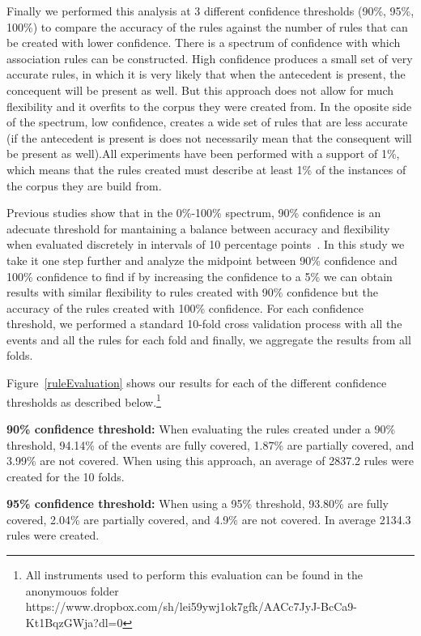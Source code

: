 \documentclass[sigconf]{acmart}
\begin{document}
Finally we performed this analysis at 3 different confidence thresholds
(90\%, 95\%, 100\%) to compare the accuracy of the rules against the 
number of rules that can be created with lower confidence. 
There is a spectrum of confidence with which association rules
can be constructed. High confidence produces a small set of very
accurate rules, in which it is very likely that when the antecedent
is present, the concequent will be present as well. But this approach
does not allow for much flexibility and it overfits to the corpus 
they were created from. In the oposite side of the spectrum, low 
confidence, creates a wide set of rules that are less accurate (if
the antecedent is present is does not necessarily mean that the 
consequent will be present as well).All 
experiments have been performed with a support of 1\%, which 
means that the rules created must describe
at least 1\% of the instances of the corpus they are build from.

Previous studies show that in the 0\%-100\% spectrum, 
90\% confidence is an adecuate threshold 
for mantaining a balance between accuracy and flexibility when evaluated
discretely in intervals of 10 percentage points~\cite{Soto18}.
In this study we take it one step further and analyze the midpoint between 90\%
confidence and 100\% confidence to find if by increasing the confidence to a 5\%
we can obtain results with similar flexibility to rules created with 90\% 
confidence but the accuracy of the rules created with 100\% confidence.
For each confidence
threshold, we performed a standard 10-fold cross validation process with all the
events and all the rules for each fold and finally, we aggregate the results
from all folds.

Figure~\ref{ruleEvaluation} shows our results for each of the 
different confidence thresholds as described below.\footnote{All instruments
used to perform this evaluation can be found in the anonymouos folder 
https://www.dropbox.com/sh/lei59ywj1ok7gfk/AACc7JyJ-BcCa9-Kt1BqzGWja?dl=0}

\noindent\textbf{90\% confidence threshold:}
When evaluating the rules created under a 90\% threshold, 94.14\% of the 
events are fully covered, 1.87\% are partially covered, and 3.99\% are
not covered. When using this approach, an average of 2837.2 rules were
created for the 10 folds.

\noindent\textbf{95\% confidence threshold:}
When using a 95\% threshold, 93.80\% are fully covered, 2.04\% are
partially covered, and 4.9\% are not covered. In average 2134.3 rules
were created.
\end{document}
